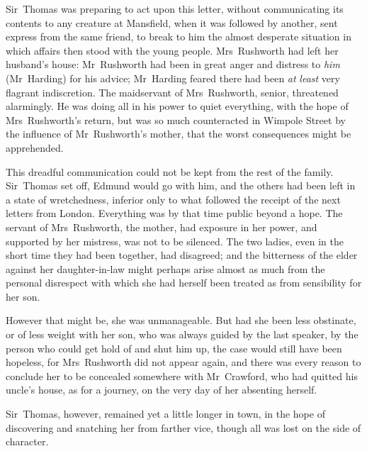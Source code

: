 Sir~Thomas was preparing to act upon this letter, without communicating its contents to any creature at Mansfield, when it was followed by another, sent express from the same friend, to break to him the almost desperate situation in which affairs then stood with the young people. Mrs~Rushworth had left her husband's house: Mr~Rushworth had been in great anger and distress to \textit{him}  (Mr~Harding) for his advice; Mr~Harding feared there had been \textit{at}  \textit{least}  very flagrant indiscretion. The maidservant of Mrs~Rushworth, senior, threatened alarmingly. He was doing all in his power to quiet everything, with the hope of Mrs~Rushworth's return, but was so much counteracted in Wimpole Street by the influence of Mr~Rushworth's mother, that the worst consequences might be apprehended.

This dreadful communication could not be kept from the rest of the family. Sir~Thomas set off, Edmund would go with him, and the others had been left in a state of wretchedness, inferior only to what followed the receipt of the next letters from London. Everything was by that time public beyond a hope. The servant of Mrs~Rushworth, the mother, had exposure in her power, and supported by her mistress, was not to be silenced. The two ladies, even in the short time they had been together, had disagreed; and the bitterness of the elder against her daughter-in-law might perhaps arise almost as much from the personal disrespect with which she had herself been treated as from sensibility for her son.

However that might be, she was unmanageable. But had she been less obstinate, or of less weight with her son, who was always guided by the last speaker, by the person who could get hold of and shut him up, the case would still have been hopeless, for Mrs~Rushworth did not appear again, and there was every reason to conclude her to be concealed somewhere with Mr~Crawford, who had quitted his uncle's house, as for a journey, on the very day of her absenting herself.

Sir~Thomas, however, remained yet a little longer in town, in the hope of discovering and snatching her from farther vice, though all was lost on the side of character.

